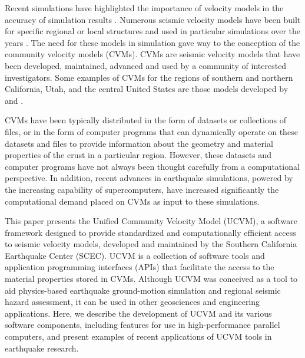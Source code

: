 Recent simulations have highlighted the importance of velocity models in the accuracy of simulation results \citep[e.g.,][]{Taborda_2014_BSSA}. Numerous seismic velocity models have been built for specific regional or local structures and used in particular simulations over the years \citep[e.g.,][]{Frankel_1992_BSSA, Brocher_2008_BSSA, Graves_2008_BSSA}. The need for these models in simulation gave way to the conception of the community velocity models (CVMs). CVMs are seismic velocity models that have been developed, maintained, advanced and used by a community of interested investigators. Some examples of CVMs for the regions of southern and northern California, Utah, and the central United States are those models developed by \citet{Kohler_2003_BSSA, Brocher_2006_Proc, Magistrale_2006_Tech} and \citet{RamirezGuzman_2012_BSSA}. 

CVMs have been typically distributed in the form of datasets or collections of files, or in the form of computer programs that can dynamically operate on these datasets and files to provide information about the geometry and material properties of the crust in a particular region. However, these datasets and computer programs have not always been thought carefully from a computational perspective. In addition, recent advances in earthquake simulations, powered by the increasing capability of supercomputers, have increased significantly the computational demand placed on CVMs as input to these simulations. 

This paper presents the Unified Community Velocity Model (UCVM), a software framework designed to provide standardized and computationally efficient access to seismic velocity models, developed and maintained by the Southern California Earthquake Center (SCEC). UCVM is a collection of software tools and application programming interfaces (APIs) that facilitate the access to the material properties stored in CVMs. Although UCVM was conceived as a tool to aid physics-based earthquake ground-motion simulation and regional seismic hazard assessment, it can be used in other geosciences and engineering applications. Here, we describe the development of UCVM and its various software components, including features for use in high-performance parallel computers, and present examples of recent applications of UCVM tools in earthquake research.

